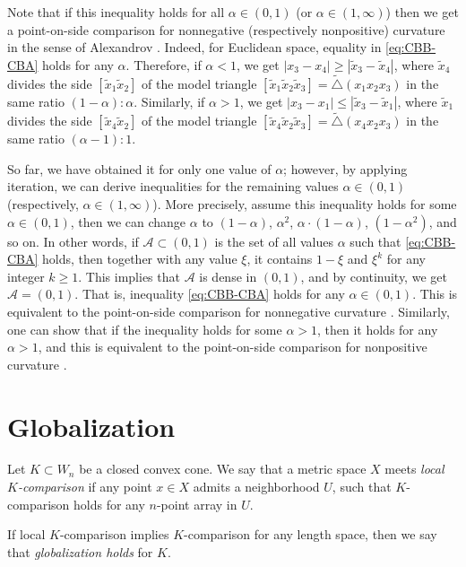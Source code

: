 \documentclass[a4paper,10pt]{article}
\begin{document}
Note that if this inequality holds for all $\alpha\in (0,1)$ (or $\alpha\in (1,\infty)$) then we get
a point-on-side comparison for nonnegative (respectively nonpositive) curvature in the sense of Alexandrov \cite[8.14 and 9.14]{AKP-2024}.
Indeed, for Euclidean space, equality in \ref{eq:CBB-CBA} holds for any $\alpha$.
Therefore, if $\alpha<1$, we get $|x_3-x_4|\ge |\tilde x_3-\tilde x_4|$, where $\tilde x_4$ divides the side $[\tilde x_1\tilde x_2]$ of the model triangle $[\tilde x_1\tilde x_2\tilde x_3]=\tilde\triangle(x_1x_2x_3)$ in the same ratio $(1-\alpha):\alpha$.
Similarly, if $\alpha>1$, we get $|x_3-x_1|\le |\tilde x_3-\tilde x_1|$, where $\tilde x_1$ divides the side $[\tilde x_4\tilde x_2]$ of the model triangle $[\tilde x_4\tilde x_2\tilde x_3]=\tilde\triangle(x_4x_2x_3)$ in the same ratio $(\alpha-1):1$.

So far, we have obtained it for only one value of $\alpha$;
however, by applying iteration, we can derive inequalities for the remaining values $\alpha\in (0,1)$ (respectively, $\alpha\in (1,\infty)$).
More precisely, assume this inequality holds for some $\alpha\in (0,1)$,
then we can change $\alpha$ to $(1-\alpha)$, $\alpha^2$,  $\alpha\cdot (1-\alpha)$, $(1-\alpha^2)$, and so on.
In other words, if $\mathcal{A}\subset(0,1)$ is the set of all values $\alpha$ such that \ref{eq:CBB-CBA} holds, then together with any value $\xi$, it contains $1-\xi$ and $\xi^k$ for any integer $k\ge 1$.
This implies that $\mathcal{A}$ is dense in $(0,1)$, and by continuity, we get $\mathcal{A}=(0,1)$.
That is, inequality \ref{eq:CBB-CBA} holds for any $\alpha\in (0,1)$.
This is equivalent to the point-on-side comparison for nonnegative curvature \cite[8.14]{AKP-2024}.
Similarly, one can show that if the inequality holds for some $\alpha>1$, then it holds for any $\alpha>1$,
and this is equivalent to the point-on-side comparison for nonpositive curvature \cite[9.14]{AKP-2024}.
\qeds

\section{Globalization}\label{par:globalization}

Let $K\subset W_n$ be a closed convex cone.
We say that a metric space $X$ meets \emph{local $K$-comparison} if any point $x\in X$ admits a neighborhood $U$, such that $K$-comparison holds for any $n$-point array in $U$.

If local $K$-comparison implies $K$-comparison for any length space, then we say that \emph{globalization holds} for $K$.
\end{document}
